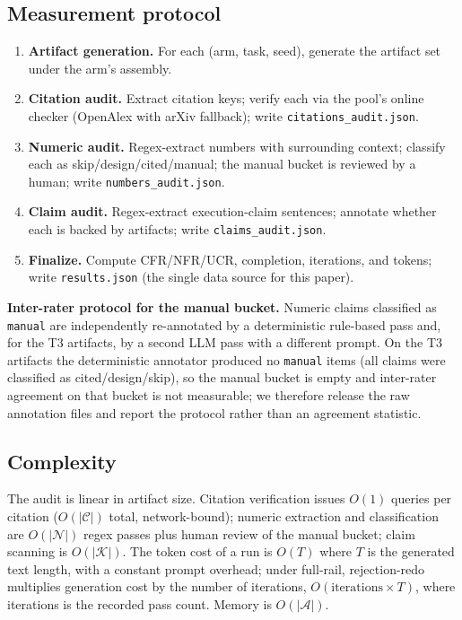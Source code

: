 \documentclass[10pt,twocolumn]{article}
\begin{document}
\subsection{Measurement protocol}
\begin{enumerate}[leftmargin=*]
\item \textbf{Artifact generation.} For each (arm, task, seed), generate the artifact set under the arm's assembly.
\item \textbf{Citation audit.} Extract citation keys; verify each via the pool's online checker (OpenAlex with arXiv fallback); write \texttt{citations\_audit.json}.
\item \textbf{Numeric audit.} Regex-extract numbers with surrounding context; classify each as skip/design/cited/manual; the manual bucket is reviewed by a human; write \texttt{numbers\_audit.json}.
\item \textbf{Claim audit.} Regex-extract execution-claim sentences; annotate whether each is backed by artifacts; write \texttt{claims\_audit.json}.
\item \textbf{Finalize.} Compute CFR/NFR/UCR, completion, iterations, and tokens; write \texttt{results.json} (the single data source for this paper).
\end{enumerate}

\textbf{Inter-rater protocol for the manual bucket.} Numeric claims classified as \texttt{manual} are independently re-annotated by a deterministic rule-based pass and, for the T3 artifacts, by a second LLM pass with a different prompt. On the T3 artifacts the deterministic annotator produced no \texttt{manual} items (all claims were classified as cited/design/skip), so the manual bucket is empty and inter-rater agreement on that bucket is not measurable; we therefore release the raw annotation files and report the protocol rather than an agreement statistic.


\subsection{Complexity}
The audit is linear in artifact size. Citation verification issues $O(1)$ queries per citation ($O(|\mathcal{C}|)$ total, network-bound); numeric extraction and classification are $O(|\mathcal{N}|)$ regex passes plus human review of the manual bucket; claim scanning is $O(|\mathcal{K}|)$. The token cost of a run is $O(T)$ where $T$ is the generated text length, with a constant prompt overhead; under full-rail, rejection-redo multiplies generation cost by the number of iterations, $O(\mathrm{iterations} \times T)$, where iterations is the recorded pass count. Memory is $O(|\mathcal{A}|)$.
\end{document}
